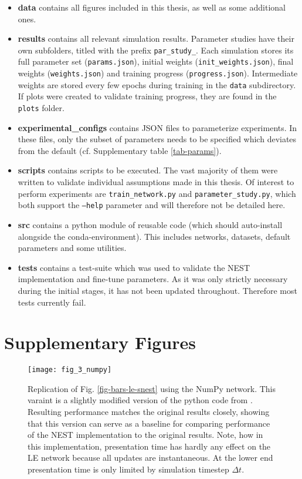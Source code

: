 \begin{itemize}
  \item \textbf{data} contains all figures included in this thesis, as well as some additional ones.
  \item \textbf{results} contains all relevant simulation results. Parameter studies have their own subfolders, titled
  with the prefix \texttt{par\_study\_}. Each simulation stores its full parameter set (\texttt{params.json}), initial
  weights (\texttt{init\_weights.json}), final weights (\texttt{weights.json}) and training progress
  (\texttt{progress.json}). Intermediate weights are stored every few epochs during training in the \texttt{data}
  subdirectory. If plots were created to validate training progress, they are found in the \texttt{plots} folder.
  \item \textbf{experimental\_configs} contains JSON files to parameterize experiments. In these files, only the subset 
  of parameters needs to be specified which deviates from the default (cf. Supplementary table \ref{tab-params}).
  \item \textbf{scripts} contains scripts to be executed. The vast majority of them were written to validate individual
  assumptions made in this thesis. Of interest to perform experiments are \texttt{train\_network.py} and
  \texttt{parameter\_study.py}, which both support the \texttt{--help} parameter and will therefore not be detailed
  here.
  \item \textbf{src} contains a python module of reusable code (which should auto-install alongside the
  conda-environment). This includes networks, datasets, default parameters and some utilities.
  \item \textbf{tests} contains a test-suite which was used to validate the NEST implementation and fine-tune
  parameters. As it was only strictly necessary during the initial stages, it has not been updated throughout. Therefore
  most tests currently fail.
\end{itemize}


\newpage
\section{Supplementary Figures}


\renewcommand{\thefigure}{S\arabic{figure}}
\begin{figure}[h!]
  \centering
  \texttt{[image: fig\_3\_numpy]}
  \caption[Replication of Fig. \ref{fig-bars-le-snest} using the NumPy network]{Replication of Fig.
    \ref{fig-bars-le-snest} using the NumPy network. This varaint is a slightly modified version of the python code from
    \citep{Haider2021}. Resulting performance matches the original results closely, showing that this version can serve
    as a baseline for comparing performance of the NEST implementation to the original results. Note, how in this
    implementation, presentation time has hardly any effect on the LE network because all updates are instantaneous. At
    the lower end presentation time is only limited by simulation timestep $\Delta t$.}
  \label{fig-bars-le-numpy}
\end{figure}


